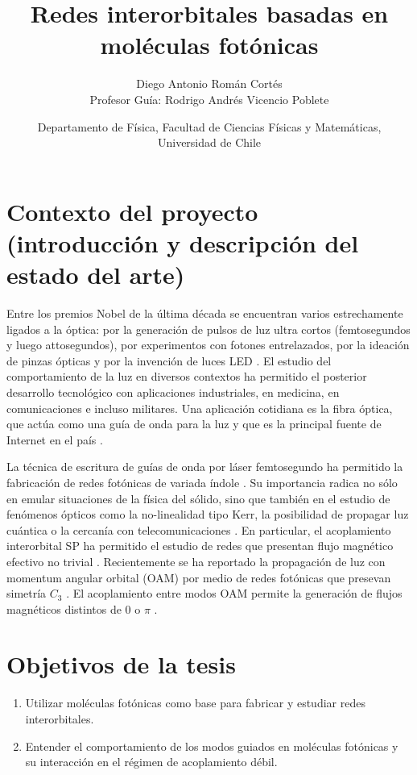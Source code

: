 \documentclass{article}
\author{Diego Antonio Román Cortés\\Profesor Guía: Rodrigo Andrés Vicencio Poblete}
\date{Departamento de Física, Facultad de Ciencias Físicas y Matemáticas, Universidad de Chile}
\title{Redes interorbitales basadas en moléculas fotónicas}
\begin{document}
 \maketitle

\section{Contexto del proyecto (introducción y descripción del estado del arte)}
	
	Entre los premios Nobel de la última década se encuentran varios estrechamente ligados a la óptica: por la generación de pulsos de luz ultra cortos (femtosegundos y luego attosegundos), por experimentos con fotones entrelazados, por la ideación de pinzas ópticas y por la invención de luces LED \cite{nobel}. El estudio del comportamiento de la luz en diversos contextos ha permitido el posterior desarrollo tecnológico con aplicaciones industriales, en medicina, en comunicaciones e incluso militares. Una aplicación cotidiana es la fibra óptica, que actúa como una guía de onda para la luz y que es la principal fuente de Internet en el país \cite{fibra}. 
	
	La técnica de escritura de guías de onda por láser femtosegundo ha permitido la fabricación de redes fotónicas de variada índole \cite{femto, bics, artificialFB, FBdynamics}. Su importancia radica no sólo en emular situaciones de la física del sólido, sino que también en el estudio de fenómenos ópticos como la no-linealidad tipo Kerr, la posibilidad de propagar luz cuántica o la cercanía con telecomunicaciones \cite{discretesolitons, qed, squeezed, topoquantum, telecom}.
	En particular, el acoplamiento interorbital SP ha permitido el estudio de redes que presentan flujo magnético efectivo no trivial \cite{interorbital, OAMCaging, ABCaging}. Recientemente se ha reportado la propagación de luz con momentum angular orbital (OAM) por medio de redes fotónicas que presevan simetría $C_3$ \cite{vortex}. El acoplamiento entre modos OAM permite la generación de flujos magnéticos distintos de $0$ o $\pi$ \cite{vortextrim}.
\section{Objetivos de la tesis}
\begin{enumerate}
	\item Utilizar moléculas fotónicas como base para fabricar y estudiar redes interorbitales.
	\item Entender el comportamiento de los modos guiados en moléculas fotónicas y su interacción en el régimen de acoplamiento débil.
\end{enumerate}
\end{document}
